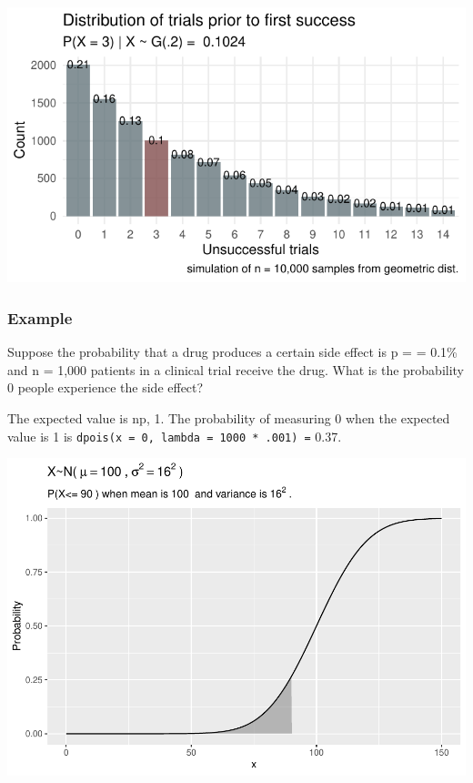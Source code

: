 \documentclass[
]{book}
\begin{document}
\includegraphics{data-sci_files/figure-latex/unnamed-chunk-12-1.pdf}

\hypertarget{example-7}{%
\subsubsection*{Example}\label{example-7}}

Suppose the probability that a drug produces a certain side effect is p = = 0.1\% and n = 1,000 patients in a clinical trial receive the drug. What is the probability 0 people experience the side effect?

The expected value is np, 1. The probability of measuring 0 when the expected value is 1 is \texttt{dpois(x\ =\ 0,\ lambda\ =\ 1000\ *\ .001)\ =} 0.37.

\includegraphics{data-sci_files/figure-latex/unnamed-chunk-13-1.pdf}
\end{document}
